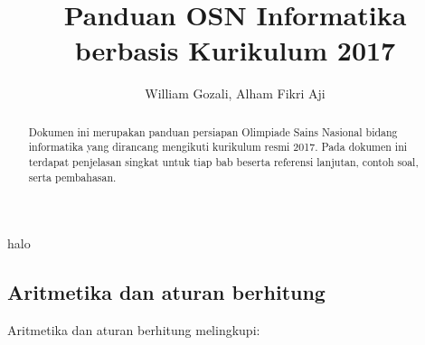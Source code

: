 \documentclass[]{article}
\title{Panduan OSN Informatika berbasis Kurikulum 2017}
\author{William Gozali, Alham Fikri Aji}
\institute{Ikatan Alumni Tim Olimpiade Komputer Indonesia}
\date{}
\begin{document}
\maketitle
\begin{abstract}
Dokumen ini merupakan panduan persiapan Olimpiade Sains Nasional bidang informatika yang dirancang mengikuti kurikulum resmi 2017. Pada dokumen ini terdapat penjelasan singkat untuk tiap bab beserta referensi lanjutan, contoh soal, serta pembahasan.
\end{abstract}

{
halo

\setcounter{tocdepth}{3}
\tableofcontents
}
\subsection{Aritmetika dan aturan
berhitung}\label{aritmetika-dan-aturan-berhitung}

Aritmetika dan aturan berhitung melingkupi:
\end{document}
